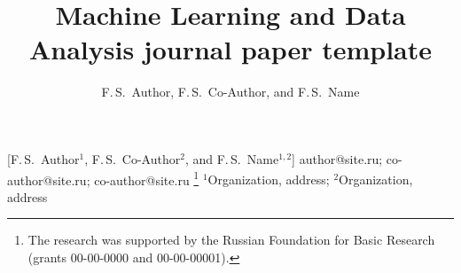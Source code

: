 \documentclass[12pt, twoside]{article}
\begin{document}
\English

\title
	[JMLDA paper template] %
    {Machine Learning and Data Analysis journal paper template} %
\author
	[F.\,S.~Author] %
	{F.\,S.~Author, F.\,S.~Co-Author, and F.\,S.~Name} %
    [F.\,S.~Author$^1$, F.\,S.~Co-Author$^2$, and F.\,S.~Name$^{1, 2}$] %
\email
    {author@site.ru; co-author@site.ru; co-author@site.ru}
\thanks
    {The research was
     supported by the Russian Foundation for Basic Research (grants 00-00-0000 and 00-00-00001).}
\organization
    {$^1$Organization, address;
     $^2$Organization, address}
\abstract
\end{document}

